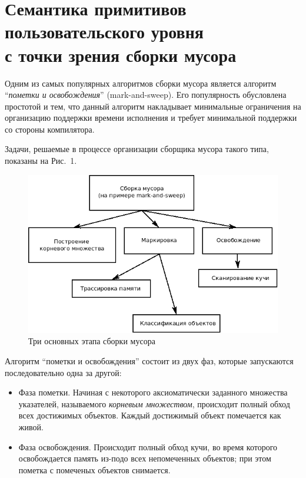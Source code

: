 \section{Семантика примитивов\\
пользовательского уровня\\
с точки зрения сборки мусора}

Одним из самых популярных алгоритмов сборки мусора является  алгоритм ``\emph{пометки и 
освобождения}'' (mark-and-sweep). Его популярность обусловлена простотой и тем, что 
данный алгоритм накладывает минимальные ограничения на организацию поддержки времени
исполнения и требует минимальной поддержки со стороны компилятора. 

Задачи, решаемые в процессе организации сборщика мусора такого типа, показаны на Рис.~1.

\begin{figure}[h!]
	\centering
	\includegraphics[width=\linewidth]{Kren/picture1.png}
	\caption{Три основных этапа сборки мусора}
	\centering
\end{figure}

Алгоритм ``пометки и освобождения'' состоит из двух фаз, которые запускаются последовательно
одна за другой:

\begin{itemize}
\item Фаза пометки. Начиная с некоторого аксиоматически заданного множества указателей, называемого
\emph{корневым множеством}, происходит полный обход всех достижимых объектов. Каждый достижимый
объект помечается как живой.
\item Фаза освобождения. Происходит полный обход кучи, во время которого освобождается память
из-подо всех непомеченных объектов; при этом пометка с помеченых объектов снимается.
\end{itemize}

